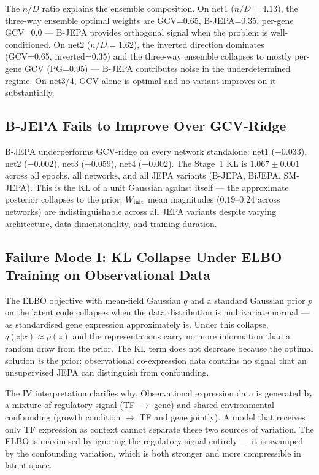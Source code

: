 \documentclass[11pt]{article}
\begin{document}
The $n/D$ ratio explains the ensemble composition.
On net1 ($n/D = 4.13$), the three-way ensemble optimal weights are GCV=0.65,
B-JEPA=0.35, per-gene GCV=0.0 --- B-JEPA provides orthogonal signal when the
problem is well-conditioned.
On net2 ($n/D = 1.62$), the inverted direction dominates (GCV=0.65,
inverted=0.35) and the three-way ensemble collapses to mostly per-gene GCV
(PG=0.95) --- B-JEPA contributes noise in the underdetermined regime.
On net3/4, GCV alone is optimal and no variant improves on it substantially.

\subsection{B-JEPA Fails to Improve Over GCV-Ridge}

B-JEPA underperforms GCV-ridge on every network standalone:
net1 ($-0.033$), net2 ($-0.002$), net3 ($-0.059$), net4 ($-0.002$).
The Stage~1 KL is $1.067 \pm 0.001$ across all epochs, all networks, and all
JEPA variants (B-JEPA, BiJEPA, SM-JEPA).
This is the KL of a unit Gaussian against itself --- the approximate posterior
collapses to the prior.
$W_{\rm init}$ mean magnitudes ($0.19$--$0.24$ across networks) are
indistinguishable across all JEPA variants despite varying architecture,
data dimensionality, and training duration.

\subsection{Failure Mode I: KL Collapse Under ELBO Training on Observational Data}

The ELBO objective with mean-field Gaussian $q$ and a standard Gaussian prior
$p$ on the latent code collapses when the data distribution is multivariate
normal --- as standardised gene expression approximately is.
Under this collapse, $q(z|x) \approx p(z)$ and the representations carry no
more information than a random draw from the prior.
The KL term does not decrease because the optimal solution \emph{is} the prior:
observational co-expression data contains no signal that an unsupervised JEPA
can distinguish from confounding.

The IV interpretation clarifies why.
Observational expression data is generated by a mixture of regulatory signal
(TF $\to$ gene) and shared environmental confounding (growth condition $\to$
TF and gene jointly).
A model that receives only TF expression as context cannot separate these two
sources of variation.
The ELBO is maximised by ignoring the regulatory signal entirely --- it is
swamped by the confounding variation, which is both stronger and more
compressible in latent space.
\end{document}
